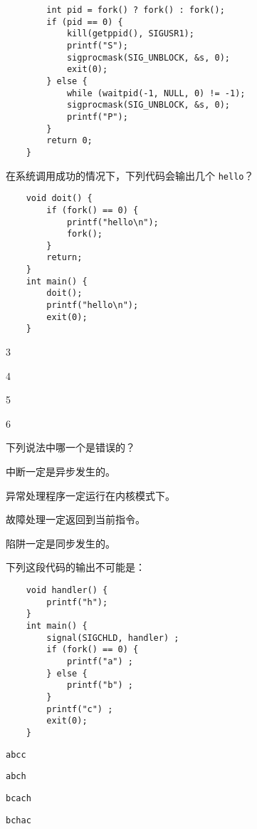 \begin{problems}
\begin{verbatim}
        int pid = fork() ? fork() : fork();
        if (pid == 0) {
            kill(getppid(), SIGUSR1);
            printf("S");
            sigprocmask(SIG_UNBLOCK, &s, 0);
            exit(0);
        } else {
            while (waitpid(-1, NULL, 0) != -1);
            sigprocmask(SIG_UNBLOCK, &s, 0);
            printf("P");
        }
        return 0;
    }
        \end{verbatim}
         在系统调用成功的情况下，下列代码会输出几个 \verb|hello|？
        \begin{verbatim}
    void doit() {
        if (fork() == 0) {
            printf("hello\n");
            fork();
        }
        return;
    }
    int main() {
        doit();
        printf("hello\n");
        exit(0);
    }
        \end{verbatim}
        \begin{choices}
            \item 3
            \item 4
            \item 5
            \item 6
        \end{choices}
         下列说法中哪一个是错误的？
        \begin{choices}
            \item 中断一定是异步发生的。
            \item 异常处理程序一定运行在内核模式下。
            \item 故障处理一定返回到当前指令。
            \item 陷阱一定是同步发生的。
        \end{choices}
         下列这段代码的输出不可能是：
        \begin{verbatim}
    void handler() {
        printf("h");
    }
    int main() {
        signal(SIGCHLD, handler) ;
        if (fork() == 0) {
            printf("a") ;
        } else {
            printf("b") ;
        }
        printf("c") ;
        exit(0);
    }
        \end{verbatim}
        \begin{choices}
            \item \verb|abcc|
            \item \verb|abch|
            \item \verb|bcach|
            \item \verb|bchac|
        \end{choices}

\end{problems}
